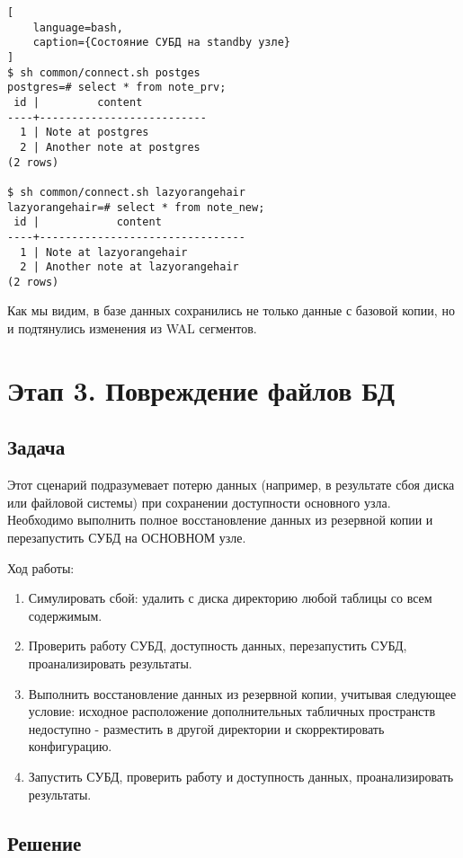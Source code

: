 \documentclass{article}
\begin{document}
\begin{lstlisting}[
    language=bash,
    caption={Состояние СУБД на standby узле}
]
$ sh common/connect.sh postges 
postgres=# select * from note_prv;
 id |         content          
----+--------------------------
  1 | Note at postgres
  2 | Another note at postgres
(2 rows)

$ sh common/connect.sh lazyorangehair
lazyorangehair=# select * from note_new;
 id |            content             
----+--------------------------------
  1 | Note at lazyorangehair
  2 | Another note at lazyorangehair
(2 rows)
\end{lstlisting}

Как мы видим, в базе данных сохранились не только данные с базовой копии, но и подтянулись изменения из WAL сегментов.

\section{Этап 3. Повреждение файлов БД}

\subsection{Задача}

Этот сценарий подразумевает потерю данных (например, в результате сбоя диска или файловой системы) при сохранении доступности основного узла. Необходимо выполнить полное восстановление данных из резервной копии и перезапустить СУБД на ОСНОВНОМ узле.

Ход работы:

\begin{enumerate}
    \item Симулировать сбой: удалить с диска директорию любой таблицы со всем содержимым.
    \item Проверить работу СУБД, доступность данных, перезапустить СУБД, проанализировать результаты.
    \item Выполнить восстановление данных из резервной копии, учитывая следующее условие: исходное расположение дополнительных табличных пространств недоступно - разместить в другой директории и скорректировать конфигурацию.
    \item Запустить СУБД, проверить работу и доступность данных, проанализировать результаты.
\end{enumerate}

\subsection{Решение}
\end{document}
